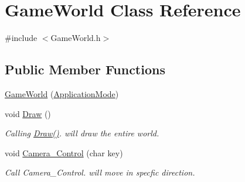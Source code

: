\hypertarget{classGameWorld}{}\section{Game\+World Class Reference}
\label{classGameWorld}


{\ttfamily \#include $<$Game\+World.\+h$>$}

\subsection*{Public Member Functions}
\begin{DoxyCompactItemize}
\item 
\hyperlink{classGameWorld_a17a84e57a80600961088afc753036f89}{Game\+World} (\hyperlink{common_8h_add86e7c88dd109abea3f708b422f31f0}{Application\+Mode})
\item 
void \hyperlink{classGameWorld_a275418607d8286979b276f165ad5876b}{Draw} ()
\begin{DoxyCompactList}\small\item\em Calling \hyperlink{classGameWorld_a275418607d8286979b276f165ad5876b}{Draw()}. will draw the entire world. \end{DoxyCompactList}\item 
void \hyperlink{classGameWorld_a43080b1c693798b12f7faf28a6b45ab5}{Camera\+\_\+\+Control} (char key)
\begin{DoxyCompactList}\small\item\em Call Camera\+\_\+\+Control. will move in specfic direction. \end{DoxyCompactList}\end{DoxyCompactItemize}
